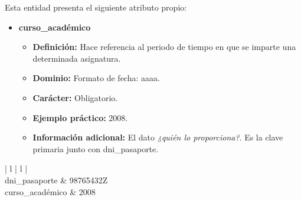 \begin{description}
   \item[Descripción de los atributos propios] Esta entidad presenta el
   siguiente atributo propio:

   \begin{itemize}
   \item \textbf{curso\_académico}
      \begin{itemize}
         \item \textbf{Definición:} Hace referencia al periodo de tiempo en que se imparte una determinada asignatura.
         \item \textbf{Dominio:} Formato de fecha: aaaa.
         \item \textbf{Carácter:}  Obligatorio.
         \item \textbf{Ejemplo práctico:} 2008.
         \item \textbf{Información adicional:} El dato \textit{¿quién lo proporciona?}. Es la clave primaria junto con dni\_pasaporte.
      \end{itemize}
   \end{itemize}

   \item[Ejemplo práctico]

   \item \begin{center}
            \begin{tabular}{ | l | l | }
            \hline
             \\
            \hline
            dni\_pasaporte & 98765432Z \\
            \hline
            curso\_académico & 2008 \\
            \hline
            \end{tabular}
         \end{center}
   \end{description}
